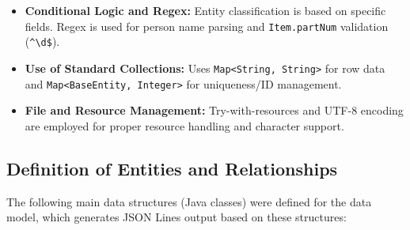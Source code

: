 \begin{itemize}
    \item \textbf{Conditional Logic and Regex:} Entity classification is based on specific fields. Regex is used for person name parsing and \texttt{Item.partNum} validation (\texttt{\^{}\textbackslash{}d\$}).

    \item \textbf{Use of Standard Collections:} Uses \texttt{Map<String, String>} for row data and \texttt{Map<BaseEntity, Integer>} for uniqueness/ID management.

    \item \textbf{File and Resource Management:} Try-with-resources and UTF-8 encoding are employed for proper resource handling and character support.
\end{itemize}

\subsection{Definition of Entities and Relationships}
The following main data structures (Java classes) were defined for the data model, which generates JSON Lines output based on these structures:

